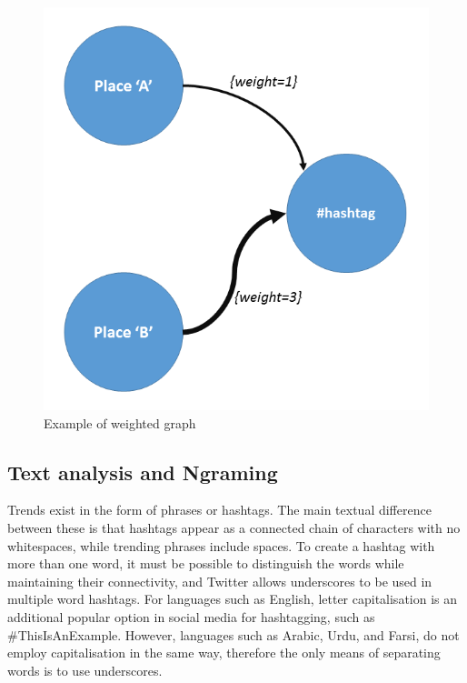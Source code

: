 \documentclass[conference]{IEEEtran}
\begin{document}


\begin{figure}[!ht] \centering
\includegraphics[width=\columnwidth]{images/w_graph.png}
\caption{Example of weighted graph}
\label{fig:w_graph}
\end{figure}


\subsection{Text analysis and Ngraming}

Trends exist in the form of phrases or hashtags. The main textual
difference between these is that hashtags appear as a connected chain
of characters with no whitespaces, while trending phrases include
spaces. To create a hashtag with more than one word, it must be
possible to distinguish the words while maintaining their
connectivity, and Twitter allows underscores to be used in multiple
word hashtags. For languages such as English, letter capitalisation is
an additional popular option in social media for hashtagging, such as
\#ThisIsAnExample. However, languages such as Arabic, Urdu, and Farsi,
do not employ capitalisation in the same way, therefore the only means
of separating words is to use underscores.  
\end{document}
